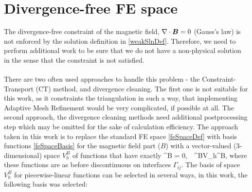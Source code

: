 \section{Divergence-free FE space}
\label{sec:divFreeSpace}
The divergence-free constraint of the magnetic field, $\nabla \cdot \mbox{\boldmath $B$} = 0$ (Gauss's law) is not enforced by the solution definition in \cref{weakSlnDef}. Therefore, we need to perform additional work to be sure that we do not have a non-physical solution in the sense that the constraint is not satisfied.
\paragraph{}
There are two often used approaches to handle this problem - the Constraint-Transport (CT) method, and divergence cleaning. The first one is not suitable for this work, as it constraints the triangulation in such a way, that implementing Adaptive Mesh Refinement would be very complicated, if possible at all. The second approach, the divergence cleaning methods need additional postprocessing step which may be omitted for the sake of calculation efficiency. The approach taken in this work is to replace the standard FE space  \cref{feSpaceDef} with basis functions \cref{feSpaceBasis} for the magnetic field part ($B$) with a vector-valued (3-dimensional) space $V_h^B$ of functions that have exactly
\be
\nabla \cdot \mrvh^B = 0,\ \ \mrvh^B\in V_h^B,
\ee
where these functions are as before discontinuous on interfaces $\Gamma_{ij}$.
The basis of space $V_h^B$ for piecewise-linear functions can be selected in several ways, in this work, the following basis was selected:
